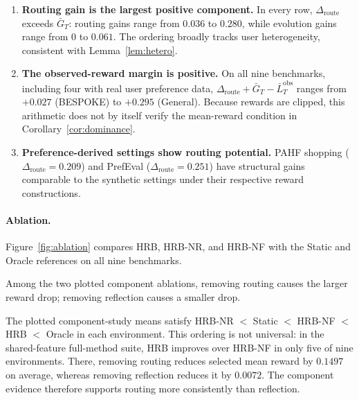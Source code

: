 \documentclass{article} %
\begin{document}
\begin{enumerate}
\item \textbf{Routing gain is the largest positive component.} In every row, $\Delta_{\mathrm{route}}$ exceeds $\bar G_T$: routing gains range from $0.036$ to $0.280$, while evolution gains range from $0$ to $0.061$. The ordering broadly tracks user heterogeneity, consistent with Lemma~\ref{lem:hetero}.
\item \textbf{The observed-reward margin is positive.} On all nine benchmarks, including four with real user preference data, $\Delta_{\mathrm{route}}+\bar G_T-\bar L_T^{\mathrm{obs}}$ ranges from $+0.027$ (BESPOKE) to $+0.295$ (General). Because rewards are clipped, this arithmetic does not by itself verify the mean-reward condition in Corollary~\ref{cor:dominance}.
\item \textbf{Preference-derived settings show routing potential.}
PAHF shopping ($\Delta_{\mathrm{route}}{=}0.209$) and PrefEval
($\Delta_{\mathrm{route}}{=}0.251$) have structural gains comparable to the
synthetic settings under their respective reward constructions.
\end{enumerate}

\paragraph{Ablation.} Figure~\ref{fig:ablation} compares HRB, HRB-NR, and
HRB-NF with the Static and Oracle references on all nine benchmarks.

Among the two plotted component ablations, removing routing causes the larger
reward drop; removing reflection causes a smaller drop.

The plotted component-study means satisfy HRB-NR $<$ Static $<$ HRB-NF
$<$ HRB $<$ Oracle in each environment. This ordering is not universal:
in the shared-feature full-method suite, HRB improves over HRB-NF in only
five of nine environments. There, removing routing reduces selected mean
reward by $0.1497$ on average, whereas removing reflection reduces it by
$0.0072$. The component evidence therefore supports routing more
consistently than reflection.
\end{document}
